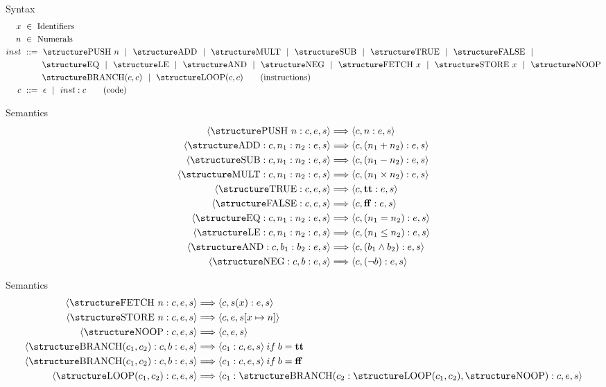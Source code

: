 \documentclass[aspectratio=169]{beamer}
\begin{document}
\begin{slide}{Syntax}
  \begin{align*}
  x &~\in~ \text{Identifiers}
  \\
  n &~\in~ \text{Numerals}
  \\
  inst &~::=~ \kw{PUSH}~n ~~|~~ \kw{ADD} ~~|~~ \kw{MULT} ~~|~~ \kw{SUB} ~~|~~ \kw{TRUE} ~~|~~ \kw{FALSE} ~~|\\
  & \:\:\:\:\:\:\:\:\:\:\:\kw{EQ} ~~|~~\kw{LE} ~~|~~\kw{AND} ~~|~~\kw{NEG} ~~|~~ \kw{FETCH}~x ~~|~~ \kw{STORE}~x ~~|~~\kw{NOOP}\\
  & \:\:\:\:\:\:\:\:\:\:\:\kw{BRANCH}(c,c) ~~|~~ \kw{LOOP}(c,c) \tag{instructions}\\
  c &~::=~ \epsilon ~~|~~ inst:c  \tag{code}
\end{align*}
\end{slide}

\begin{slide}{Semantics}
\begin{align*}
\pair{\kw{PUSH}~n:c,e,s} & \Longrightarrow \pair{c,n:e,s}\\  
\pair{\kw{ADD}:c,n_1:n_2:e,s} & \Longrightarrow \pair{c,(n_1+n_2):e,s}\\
\pair{\kw{SUB}:c,n_1:n_2:e,s} & \Longrightarrow \pair{c,(n_1-n_2):e,s}\\
\pair{\kw{MULT}:c,n_1:n_2:e,s} & \Longrightarrow \pair{c,(n_1 \times n_2):e,s}\\
\pair{\kw{TRUE}:c,e,s} & \Longrightarrow \pair{c,\mathbf{tt}:e,s}\\
\pair{\kw{FALSE}:c,e,s} & \Longrightarrow \pair{c,\mathbf{ff}:e,s}\\
\pair{\kw{EQ}:c,n_1:n_2:e,s} & \Longrightarrow \pair{c,(n_1=n_2):e,s}\\
\pair{\kw{LE}:c,n_1:n_2:e,s} & \Longrightarrow \pair{c,(n_1\le n_2):e,s}\\
\pair{\kw{AND}:c,b_1:b_2:e,s} & \Longrightarrow \pair{c,(b_1\land b_2):e,s}\\
\pair{\kw{NEG}:c,b:e,s} & \Longrightarrow \pair{c,(\neg b):e,s}
\end{align*}
\end{slide}

\begin{slide}{Semantics}
\begin{align*}
\pair{\kw{FETCH}~n:c,e,s} & \Longrightarrow \pair{c,s(x):e,s}\\
\pair{\kw{STORE}~n:c,e,s} & \Longrightarrow \pair{c,e,s[x \mapsto n]}\\
\pair{\kw{NOOP}:c,e,s} & \Longrightarrow \pair{c,e,s}\\
\pair{\kw{BRANCH}(c_1,c_2):c,b:e,s} & \Longrightarrow \pair{c_1:c,e,s}\:if\:b = \mathbf{tt}\\
\pair{\kw{BRANCH}(c_1,c_2):c,b:e,s} & \Longrightarrow \pair{c_1:c,e,s}\:if\:b = \mathbf{ff}\\
\pair{\kw{LOOP}(c_1,c_2):c,e,s} & \Longrightarrow \pair{c_1:\kw{BRANCH}(c_2:\kw{LOOP}(c_1,c_2),\kw{NOOP}):c,e,s}\\
\end{align*}
\end{slide}
\end{document}
